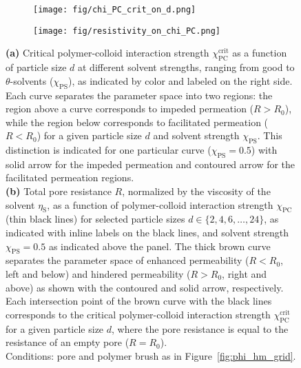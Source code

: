 \documentclass[12pt, a4paper]{article}
\begin{document}
\begin{figure}
    \centering
    \begin{subfigure}[b]{0.52\textwidth}
        \texttt{[image: fig/chi\_PC\_crit\_on\_d.png]}
        \caption{}
    \end{subfigure}%
    \hspace{0.03\textwidth}
    \begin{subfigure}[b]{0.4\textwidth}
        \texttt{[image: fig/resistivity\_on\_chi\_PC.png]}
        \caption{}
    \end{subfigure}
    \caption{
        \textbf{(a)} Critical polymer-colloid interaction strength $\chi_{\text{PC}}^{\text{crit}}$ as a function of particle size $d$ at different solvent strengths, ranging from good to $\theta$-solvents ($\chi_{\text{PS}}$), as indicated by color and labeled on the right side.
        Each curve separates the parameter space into two regions: the region above a curve corresponds to impeded permeation ($R > R_{0}$), while the region below corresponds to facilitated permeation ($R < R_{0}$) for a given particle size $d$ and solvent strength $\chi_{\text{PS}}$.
        This distinction is indicated for one particular curve ($\chi_{\text{PS}}=0.5$) with solid arrow for the impeded permeation and contoured arrow for the facilitated permeation regions.
        \\
        \textbf{(b)} Total pore resistance $R$, normalized by the viscosity of the solvent $\eta_\text{S}$, as a function of polymer-colloid interaction strength $\chi_{\text{PC}}$ (thin black lines) for selected particle sizes $d \in \{2, 4, 6, \dots, 24\}$, as indicated with inline labels on the black lines, and solvent strength $\chi_{\text{PS}}=0.5$ as indicated above the panel.
        The thick brown curve separates the parameter space of enhanced permeability ($R < R_{0}$, left and below) and hindered permeability ($R > R_{0}$, right and above) as shown with the contoured and solid arrow, respectively.
        Each intersection point of the brown curve with the black lines corresponds to the critical polymer-colloid interaction strength $\chi_{\text{PC}}^{\text{crit}}$ for a given particle size $d$, where the pore resistance is equal to the resistance of an empty pore ($R = R_{0}$).
        \\
        Conditions: pore and polymer brush as in Figure~\ref{fig:phi_hm_grid}.
    }
    \label{fig:R_vs_chi_PC}
\end{figure}
\end{document}
